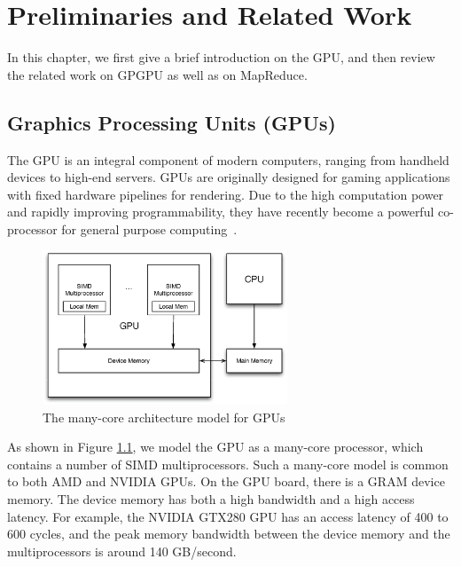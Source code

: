 \chapter{Preliminaries and Related Work}\label{sec-preliminaries}

In this chapter, we first give a brief introduction on the GPU, and then review the related work on GPGPU as well as on MapReduce.


\section{Graphics Processing Units (GPUs)}

The GPU is an integral component of
modern computers, ranging from handheld devices to high-end servers.
GPUs are originally designed for gaming applications with fixed
hardware pipelines for rendering. Due to the high computation power
and rapidly improving programmability, they have recently become a
powerful co-processor for general purpose computing~\cite{Ailamaki2006}.


\begin{figure}[ht]
\centering
\includegraphics[width=0.65\textwidth]{figure/gpuarch.eps}
\caption{The many-core architecture model for GPUs}
\label{fig:manycore}
\end{figure}



As shown in Figure \ref{fig:manycore}, we model the GPU as a many-core processor, which
contains a number of SIMD multiprocessors.
Such a many-core model is common to both AMD and NVIDIA GPUs.
On the GPU board, there is a GRAM device memory.
The device memory has both a high bandwidth and a high access latency.
For example, the NVIDIA GTX280 GPU has an access latency of 400 to 600 cycles, and
the peak memory bandwidth between the device memory and the multiprocessors
is around 140 GB/second.

